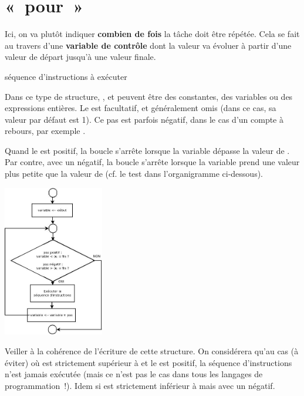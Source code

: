 \section{«~pour~»}

		Ici, on va plutôt indiquer 
		\textbf{combien de fois} la tâche doit être répétée. 
		Cela se fait au travers d’une
		\textbf{variable de contrôle} dont la valeur va évoluer à partir
		d’une valeur de départ jusqu’à une valeur finale.
		
		\begin{LDA}
			\Stmt séquence d’instructions à exécuter
		\EndFor
		\end{LDA}

		Dans ce type de structure, 
		,  et 
		peuvent être des constantes, 
		des variables ou des expressions entières. 
		Le  est facultatif, et généralement omis 
		(dans ce cas, sa valeur par défaut est 1). 
		Ce pas est parfois négatif, dans le cas d’un compte à rebours, 
		par exemple .

		Quand le  est positif, la boucle s’arrête
		lorsque la variable dépasse la valeur de . 
		Par contre, avec un  négatif, 
		la boucle s’arrête lorsque la variable prend une valeur 
		plus petite que la valeur de 
		(cf. le test dans l’organigramme ci-dessous).

		\begin{center}
			\includegraphics[width=0.33\textwidth]{image/boucle-pour}
			\label{fig:boucle-pour}
		\end{center}

		Veiller à la cohérence de l’écriture de cette structure. On considérera
		qu’au cas (à éviter) où  est strictement supérieur à
		 et le  est positif, la séquence d’instructions
		n’est jamais exécutée (mais ce n’est pas le cas dans tous les langages
		de programmation~!). Idem si  est strictement inférieur à
		 mais avec un  négatif.

